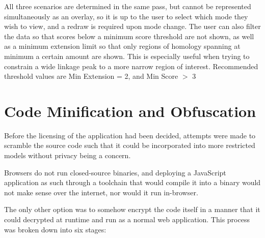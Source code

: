 All three scenarios are determined in the same pass, but cannot be represented simultaneously as an overlay, so it is up to the user to select which mode they wish to view, and a redraw is required upon mode change.  The user can also filter the data so that scores below a minimum score threshold are not shown, as well as a minimum extension limit so that only regions of homology spanning at minimum a certain amount are shown. This is especially useful when trying to constrain  a wide linkage peak to a more narrow region of interest. Recommended threshold values are Min Extension = 2, and Min Score $>$ 3

\section{Code Minification and Obfuscation}

Before the licensing of the application had been decided, attempts were made to scramble the source code such that it could be incorporated into more restricted models without privacy being a concern.

Browsers do not run closed-source binaries, and deploying a JavaScript application as such through a toolchain that would compile it into a binary would not make sense over the internet, nor would it run in-browser.

The only other option was to somehow encrypt the code itself in a manner that it could decrypted at runtime and run as a normal web application. This process was broken down into six stages:

